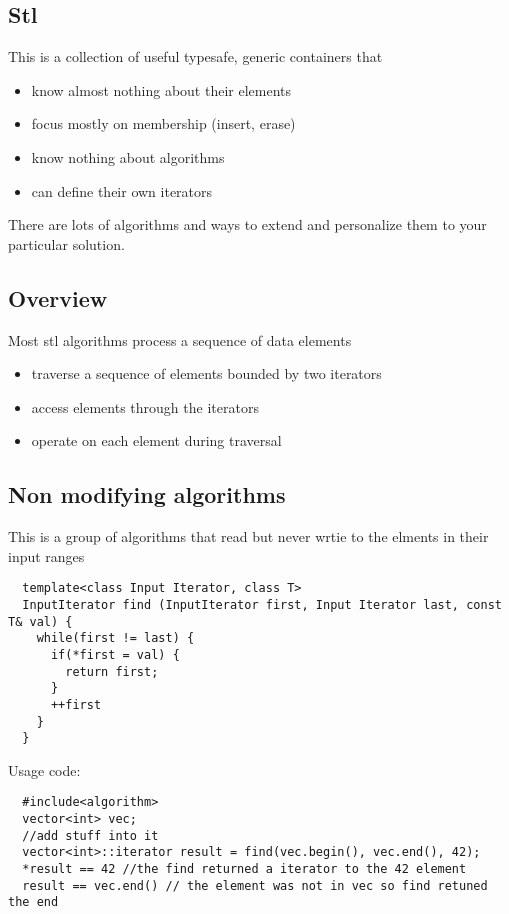 \documentclass[12pt]{article}
\begin{document}
\subsection*{Stl}
This is a collection of useful typesafe, generic containers that
\begin{itemize}
  \item know almost nothing about their elements
  \item focus mostly on membership (insert, erase)
  \item know nothing about algorithms
  \item can define their own iterators
\end{itemize}

There are lots of algorithms and ways to extend and personalize them to your particular solution.

\subsection*{Overview}
Most stl algorithms process a sequence of data elements
\begin{itemize}
  \item traverse a sequence of elements bounded by two iterators
  \item access elements through the iterators
  \item operate on each element during traversal
\end{itemize}

\subsection*{Non modifying algorithms}
This is a group of algorithms that read but never wrtie to the elments in their input ranges
\begin{lstlisting}
  template<class Input Iterator, class T>
  InputIterator find (InputIterator first, Input Iterator last, const T& val) {
    while(first != last) {
      if(*first = val) {
        return first;
      }
      ++first
    }
  }
\end{lstlisting}

Usage code:
\begin{lstlisting}
  #include<algorithm>
  vector<int> vec;
  //add stuff into it
  vector<int>::iterator result = find(vec.begin(), vec.end(), 42);
  *result == 42 //the find returned a iterator to the 42 element
  result == vec.end() // the element was not in vec so find retuned the end
\end{lstlisting}
\end{document}
